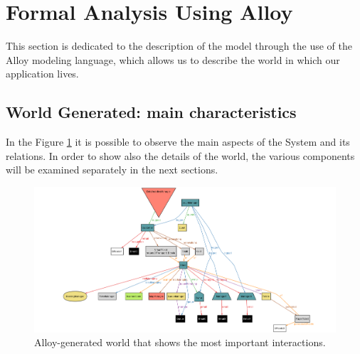 \documentclass[a4paper, 10pt, oneside]{article}
\begin{document}
\section{Formal Analysis Using Alloy}
This section is dedicated to the description of the model through the use of the Alloy modeling language, which allows us to describe the world in which our application lives.

\subsection{World Generated: main characteristics}
In the Figure \ref{alloy_world} it is possible to observe the main aspects of the System and its relations. In order to show also the details of the world, the various components will be examined separately in the next sections.
\begin{figure}[h!]
\centering
	\centering
  	\includegraphics[height=0.32\textheight, scale=0.3, keepaspectratio]{img/alloy/alloy_world.png}
	\caption{Alloy-generated world that shows the most important interactions.}
 	\label{alloy_world}
\end{figure}
\end{document}
